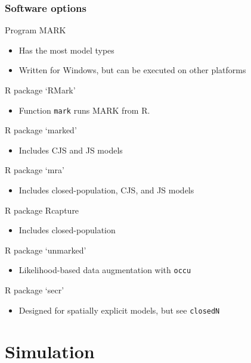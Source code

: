 \documentclass[color=usenames,dvipsnames]{beamer}\usepackage[]{graphicx}\usepackage[]{color}
\newcommand{\inr}[1]{\colorbox{inlinecolor}{\texttt{#1}}}
\begin{document}
\begin{frame}
  \frametitle{Software options}
  \small
  Program MARK
  \begin{itemize}
  \footnotesize
    \item Has the most model types
    \item Written for Windows, but can be executed on other platforms  
  \end{itemize}
  R package `RMark'
  \begin{itemize}
  \footnotesize
    \item Function \inr{mark} runs MARK from R.
  \end{itemize}
  R package `marked'
  \begin{itemize}
  \footnotesize
    \item Includes CJS and JS models
  \end{itemize}
  R package `mra'
  \begin{itemize}
  \footnotesize
    \item Includes closed-population, CJS, and JS models
  \end{itemize}
  R package Rcapture
  \begin{itemize}
  \footnotesize
    \item Includes closed-population
  \end{itemize}
  R package `unmarked'
  \begin{itemize}
  \footnotesize
    \item Likelihood-based data augmentation with \inr{occu}
  \end{itemize}
  R package `secr'
  \begin{itemize}
  \footnotesize
    \item Designed for spatially explicit models, but see \inr{closedN}
  \end{itemize}
\end{frame}




\section{Simulation}



\end{document}
